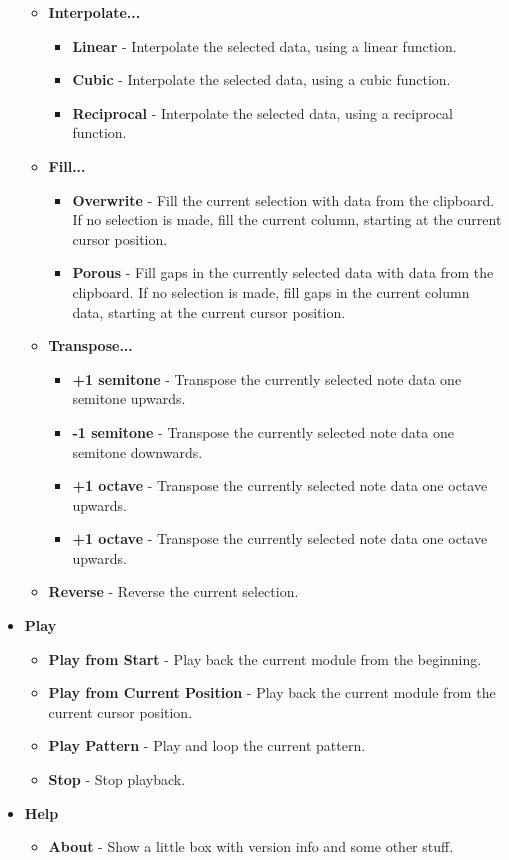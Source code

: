 \documentclass[12pt]{report}	%
\begin{document}
\begin{itemize}
\begin{itemize}
\item \textbf{Interpolate...}
\begin{itemize}
\item \textbf{Linear} - Interpolate the selected data, using a linear function.
\item \textbf{Cubic} - Interpolate the selected data, using a cubic function.
\item \textbf{Reciprocal} - Interpolate the selected data, using a reciprocal function.
\end{itemize}
\item \textbf{Fill...}
\begin{itemize}
\item \textbf{Overwrite} - Fill the current selection with data from the clipboard. If no selection is made, fill the current column, starting at the current cursor position.
\item \textbf{Porous} - Fill gaps in the currently selected data with data from the clipboard. If no selection is made, fill gaps in the current column data, starting at the current cursor position.
\end{itemize}
\item \textbf{Transpose...}
\begin{itemize}
\item \textbf{+1 semitone} - Transpose the currently selected note data one semitone upwards.
\item \textbf{-1 semitone} - Transpose the currently selected note data one semitone downwards.
\item \textbf{+1 octave} - Transpose the currently selected note data one octave upwards.
\item \textbf{+1 octave} - Transpose the currently selected note data one octave upwards.
\end{itemize}
\item \textbf{Reverse} - Reverse the current selection.
\end{itemize}
\item \textbf{Play}
\begin{itemize}
\item \textbf{Play from Start} - Play back the current module from the beginning.
\item \textbf{Play from Current Position} - Play back the current module from the current cursor position.
\item \textbf{Play Pattern} - Play and loop the current pattern.
\item \textbf{Stop} - Stop playback.
\end{itemize}
\item \textbf{Help}
\begin{itemize}
\item \textbf{About} - Show a little box with version info and some other stuff.
\end{itemize}
\end{itemize}
\end{document}
